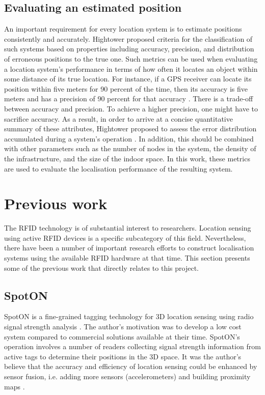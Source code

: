 \subsection{Evaluating an estimated position}

An important requirement for every location system is to estimate positions consistently and accurately. Hightower \cite{Hightower2001c} proposed criteria for the classification of such systems based on properties including accuracy, precision, and distribution of erroneous positions to the true one. Such metrics can be used when evaluating a location system's performance in terms of how often it locates an object within some distance of its true location. For instance, if a GPS receiver can locate its position within five meters for 90 percent of the time, then its accuracy is five meters and has a precision of 90 percent for that accuracy \cite{Hightower2001}. There is a trade-off between accuracy and precision. To achieve a higher precision, one might have to sacrifice accuracy. As a result, in order to arrive at a concise quantitative summary of these attributes, Hightower proposed to assess the error distribution accumulated during a system's operation \cite{Hightower2001}. In addition, this should be combined with other parameters such as the number of nodes in the system, the density of the infrastructure, and the size of the indoor space. In this work, these metrics are used to evaluate the localisation performance of the resulting system.

\section{Previous work}
\label{sec:prevwork}

The RFID technology is of substantial interest to researchers. Location sensing using active RFID devices is a specific subcategory of this field. Nevertheless, there have been a number of important research efforts to construct localisation systems using the available RFID hardware at that time. This section presents some of the previous work that directly relates to this project.


\subsection{SpotON}
\label{sec:spoton}

SpotON is a fine-grained tagging technology for 3D location sensing using radio signal strength analysis \cite{Hightower2000}. The author's motivation was to develop a low cost system compared to commercial solutions available at their time. SpotON's operation involves a number of readers collecting signal strength information from active tags to determine their positions in the 3D space. It was the author's believe that the accuracy and efficiency of location sensing could be enhanced by sensor fusion, i.e. adding more sensors (accelerometers) and building proximity maps \cite{Hightower2000}.

